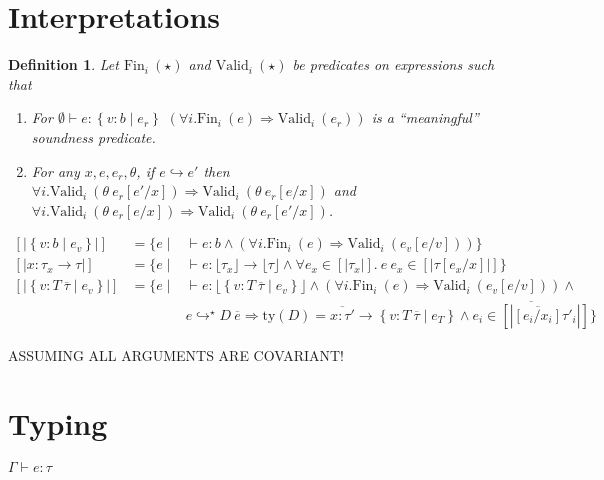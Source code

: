 \documentclass[10pt,a4paper]{article}
\newtheorem{definition}{Definition}
\newcommand\eapp[2]{\ensuremath{#1 \ #2}}
\newcommand\edata[2]{\ensuremath{#1 \ #2}}
\newcommand\tref[3]{\ensuremath{\left\lbrace {#1} \colon {#2} \mid {#3} \right\rbrace}}
\newcommand\tconref[4]{\tref{#3}{\tcon{#1}{#2}}{#4}}
\newcommand\tcon[2]{\ensuremath{#1\ #2}}
\newcommand\tfun[3]{\ensuremath{#1\colon #2 \rightarrow #3}}
\newcommand\validi[1]{\ensuremath{\text{Valid}_{i}\ (#1)}}
\newcommand\fini[1]{\ensuremath{\text{Fin}_{i}\ (#1)}}
\newcommand\generalconditionInterp[2]
	{\ensuremath{(\forall i. \fini{#1} \Rightarrow \validi{#2})}}
\newcommand\generalconditionImpl[2]
	{\ensuremath{\forall i . \validi{#1} \Rightarrow \validi{#2}}}
\newcommand\ty[1]{\ensuremath{\text{ty}({#1})}}
\newcommand\sub[2]{\ensuremath{\left[ #2 / #1 \right]}}
\newcommand\erase[1]{\ensuremath{\lfloor #1 \rfloor}}
\newcommand\interp[1]{\ensuremath{[|#1|]}}
\newcommand\eval[2]{\ensuremath{#1 \hookrightarrow #2}}
\newcommand\evals[2]{\ensuremath{#1 \hookrightarrow^\star #2}}
\newcommand\hastype[3]{\ensuremath{#1 \vdash #2 \colon #3}}
\begin{document}
\section*{Interpretations}
\begin{definition} \label{def:valid}
Let \fini{\star} and \validi{\star} be predicates on expressions such that
\begin{enumerate}
\item 
	For \hastype{\emptyset}{e}{\tref{v}{b}{e_r}}
	\generalconditionInterp{e}{e_r} is a ``meaningful''
	soundness predicate.

\item For any $x, e, e_r, \theta$, if \eval{e}{e'} then 
	\generalconditionImpl{\theta\ e_r\sub{x}{e'}}{\theta\ e_r\sub{x}{e}} and
	\generalconditionImpl{\theta\ e_r\sub{x}{e}}{\theta\ e_r\sub{x}{e'}}.
\end{enumerate} 
\end{definition}

$$
\begin{array}{lll}
\interp{\tref{v}{b}{e_v}} &=
	\{e \mid & \hastype{}{e}{b} 
	\land 
	\generalconditionInterp{e}{e_v\sub{v}{e}} 
	\}\\
\interp{\tfun{x}{\tau_x}{\tau}} &=
	\{e \mid & \hastype{}{e}{\erase{\tau_x} \rightarrow \erase{\tau}} 
	\land 
	\forall e_x \in \interp{\tau_x}. \
	 \eapp{e}{e_x} \in \interp{\tau\sub{x}{e_x}} 
	 \}\\
\interp{\tconref{T}{\overline{\tau}}{v}{e_v}} &= 
	\{e \mid & \hastype{}{e}{\erase{\tconref{T}{\overline{\tau}}{v}{e_v}}} 
	\land 
	\generalconditionInterp{e}{e_v\sub{v}{e}}
	\land \\&& 
	\evals{e}{\edata{D}{\overline{e}}} \Rightarrow 
	\ty{D} = \overline{x\colon\tau'}\rightarrow\tconref{T}{\overline{\tau}}{v}{e_T} \land 	
	\overline{e_i \in \interp{\overline{\sub{x_i}{e_i}} \tau'_i}}
	 \}
\end{array}
$$

ASSUMING ALL ARGUMENTS ARE COVARIANT!
\section*{Typing}

\hfill\mbox{\hastype{\Gamma}{e}{\tau}}
\end{document}
